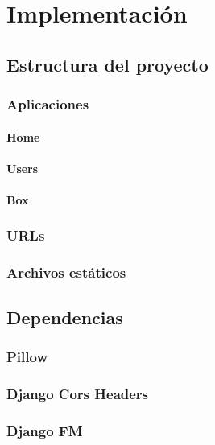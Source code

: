 \chapter{Implementación}
\label{cap:implementacion}

\section{Estructura del proyecto}

\subsection{Aplicaciones}

\subsubsection{Home}

\subsubsection{Users}

\subsubsection{Box}

\subsection{URLs}

\subsection{Archivos estáticos}

\section{Dependencias}

\subsection{Pillow}

\subsection{Django Cors Headers}

\subsection{Django FM}

